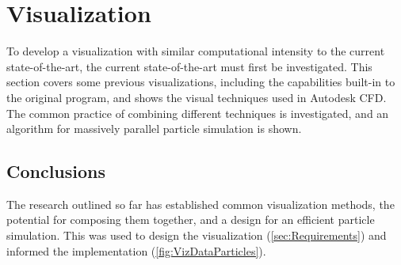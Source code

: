 



\section{Visualization}\label{sec:Research:Visualization}
To develop a visualization with similar computational intensity to the current state-of-the-art, the current state-of-the-art must first be investigated.
This section covers some previous visualizations, including the capabilities built-in to the original program, and shows the visual techniques used in Autodesk CFD.
The common practice of combining different techniques is investigated, and an algorithm for massively parallel particle simulation is shown.








\subsection{Conclusions}
The research outlined so far has established common visualization methods, the potential for composing them together, and a design for an efficient particle simulation.
This was used to design the visualization (\cref{sec:Requirements}) and informed the implementation (\cref{fig:VizDataParticles}).